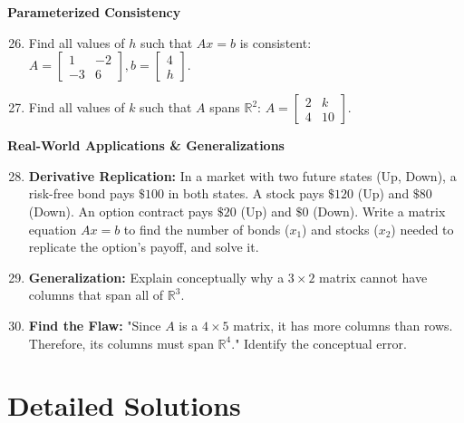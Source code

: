 \documentclass[12pt]{article}
\begin{document}
\textbf{Parameterized Consistency}
\begin{enumerate}
\setcounter{enumi}{25}
    \item Find all values of $h$ such that $Ax=b$ is consistent: $A = \begin{bmatrix} 1 & -2 \\ -3 & 6 \end{bmatrix}, b = \begin{bmatrix} 4 \\ h \end{bmatrix}$.
    \item Find all values of $k$ such that $A$ spans $\mathbb{R}^2$: $A = \begin{bmatrix} 2 & k \\ 4 & 10 \end{bmatrix}$.
\end{enumerate}

\textbf{Real-World Applications \& Generalizations}
\begin{enumerate}
\setcounter{enumi}{27}
    \item \textbf{Derivative Replication:} In a market with two future states (Up, Down), a risk-free bond pays $\$100$ in both states. A stock pays $\$120$ (Up) and $\$80$ (Down). An option contract pays $\$20$ (Up) and $\$0$ (Down). Write a matrix equation $Ax=b$ to find the number of bonds ($x_1$) and stocks ($x_2$) needed to replicate the option's payoff, and solve it.
    \item \textbf{Generalization:} Explain conceptually why a $3 \times 2$ matrix cannot have columns that span all of $\mathbb{R}^3$.
    \item \textbf{Find the Flaw:} "Since $A$ is a $4 \times 5$ matrix, it has more columns than rows. Therefore, its columns must span $\mathbb{R}^4$." Identify the conceptual error.
\end{enumerate}

\newpage

\section{Detailed Solutions}
\end{document}
